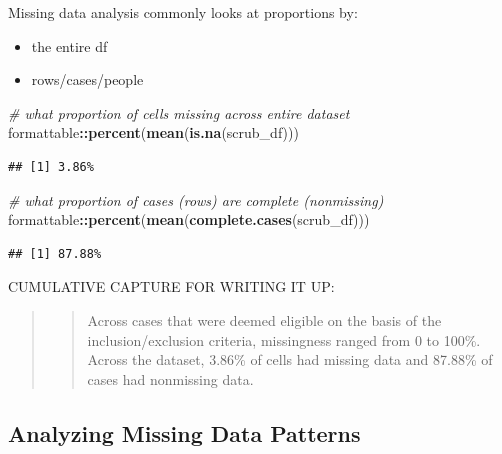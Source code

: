 \documentclass[
  11pt,
]{book}
\newenvironment{Shaded}{\begin{snugshade}}{\end{snugshade}}
\newcommand{\CommentTok}[1]{\textcolor[rgb]{0.37,0.37,0.37}{\textit{#1}}}
\newcommand{\FunctionTok}[1]{\textcolor[rgb]{0.27,0.27,0.27}{\textbf{#1}}}
\newcommand{\NormalTok}[1]{#1}
\newcommand{\SpecialCharTok}[1]{\textcolor[rgb]{0.43,0.43,0.43}{\textbf{#1}}}
\providecommand{\tightlist}{%
  \setlength{\itemsep}{0pt}\setlength{\parskip}{0pt}}
\begin{document}
Missing data analysis commonly looks at proportions by:

\begin{itemize}
\tightlist
\item
  the entire df
\item
  rows/cases/people
\end{itemize}

\begin{Shaded}
\begin{Highlighting}[]
\CommentTok{\# what proportion of cells missing across entire dataset}
\NormalTok{formattable}\SpecialCharTok{::}\FunctionTok{percent}\NormalTok{(}\FunctionTok{mean}\NormalTok{(}\FunctionTok{is.na}\NormalTok{(scrub\_df)))}
\end{Highlighting}
\end{Shaded}

\begin{verbatim}
## [1] 3.86%
\end{verbatim}

\begin{Shaded}
\begin{Highlighting}[]
\CommentTok{\# what proportion of cases (rows) are complete (nonmissing)}
\NormalTok{formattable}\SpecialCharTok{::}\FunctionTok{percent}\NormalTok{(}\FunctionTok{mean}\NormalTok{(}\FunctionTok{complete.cases}\NormalTok{(scrub\_df)))}
\end{Highlighting}
\end{Shaded}

\begin{verbatim}
## [1] 87.88%
\end{verbatim}

CUMULATIVE CAPTURE FOR WRITING IT UP:

\begin{quote}
\begin{quote}
Across cases that were deemed eligible on the basis of the inclusion/exclusion criteria, missingness ranged from 0 to 100\%. Across the dataset, 3.86\% of cells had missing data and 87.88\% of cases had nonmissing data.
\end{quote}
\end{quote}

\hypertarget{analyzing-missing-data-patterns}{%
\subsection{Analyzing Missing Data Patterns}\label{analyzing-missing-data-patterns}}
\end{document}
